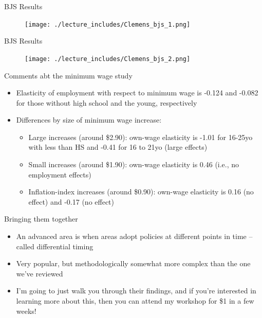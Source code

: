 \documentclass{beamer}
\begin{document}
\begin{frame}{BJS Results}

	\begin{figure}
	\texttt{[image: ./lecture\_includes/Clemens\_bjs\_1.png]}
	\end{figure}

\end{frame}

\begin{frame}{BJS Results}

	\begin{figure}
	\texttt{[image: ./lecture\_includes/Clemens\_bjs\_2.png]}
	\end{figure}

\end{frame}

\begin{frame}{Comments abt the minimum wage study}

\begin{itemize}
\item Elasticity of employment with respect to minimum wage is -0.124 and -0.082 for those without high school and the young, respectively
\item Differences by size of minimum wage increase:
	\begin{itemize}
	\item Large increases (around \$2.90): own-wage elasticity is -1.01 for 16-25yo with less than HS and -0.41 for 16 to 21yo (large effects)
	\item Small increases (around \$1.90): own-wage elasticity is 0.46 (i.e., no employment effects)
	\item Inflation-index increases (around \$0.90): own-wage elasticity is 0.16 (no effect) and -0.17 (no effect)
	\end{itemize}
\end{itemize}

\end{frame}

\begin{frame}{Bringing them together}

\begin{itemize}

\item An advanced area is when areas adopt policies at different points in time -- called differential timing
\item Very popular, but methodologically somewhat more complex than the one we've reviewed
\item I'm going to just walk you through their findings, and if you're interested in learning more about this, then you can attend my workshop for \$1 in a few weeks!

\end{itemize}

\end{frame}
\end{document}

